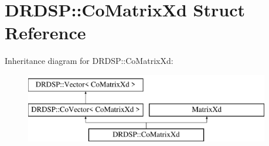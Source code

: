 \hypertarget{struct_d_r_d_s_p_1_1_co_matrix_xd}{\section{D\-R\-D\-S\-P\-:\-:Co\-Matrix\-Xd Struct Reference}
\label{struct_d_r_d_s_p_1_1_co_matrix_xd}
}
Inheritance diagram for D\-R\-D\-S\-P\-:\-:Co\-Matrix\-Xd\-:\begin{figure}[H]
\begin{center}
\leavevmode
\includegraphics[height=3.000000cm]{struct_d_r_d_s_p_1_1_co_matrix_xd}
\end{center}
\end{figure}
